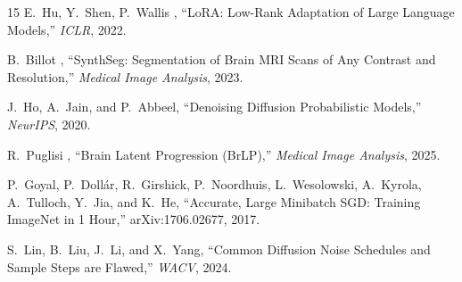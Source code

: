 \begin{thebibliography}{15}
E.~Hu, Y.~Shen, P.~Wallis \etal,
``LoRA: Low-Rank Adaptation of Large Language Models,''
\emph{ICLR}, 2022.

B.~Billot \etal,
``SynthSeg: Segmentation of Brain MRI Scans of Any Contrast and Resolution,''
\emph{Medical Image Analysis}, 2023.

J.~Ho, A.~Jain, and P.~Abbeel,
``Denoising Diffusion Probabilistic Models,''
\emph{NeurIPS}, 2020.

R.~Puglisi \etal,
``Brain Latent Progression (BrLP),''
\emph{Medical Image Analysis}, 2025.

P.~Goyal, P.~Doll\'{a}r, R.~Girshick, P.~Noordhuis, L.~Wesolowski,
A.~Kyrola, A.~Tulloch, Y.~Jia, and K.~He,
``Accurate, Large Minibatch SGD: Training ImageNet in 1 Hour,''
arXiv:1706.02677, 2017.

S.~Lin, B.~Liu, J.~Li, and X.~Yang,
``Common Diffusion Noise Schedules and Sample Steps are Flawed,''
\emph{WACV}, 2024.

\end{thebibliography}
\endgroup
